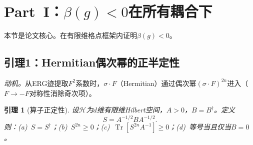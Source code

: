 \documentclass[12pt,a4paper]{article}
\theoremstyle{plain}
\newtheorem{lemma}[theorem]{引理}
\theoremstyle{definition}
\theoremstyle{remark}
\begin{document}
\section{Part~I：$\beta(g)<0$在所有耦合下}\label{sec:betaneg}

本节是论文核心。在有限维格点框架内证明$\beta(g)<0$。

\subsection{引理1：Hermitian偶次幂的正半定性}\label{sec:lemma1}

\textit{动机。}从ERG迹提取$F^2$系数时，$\sigma\cdot F$（Hermitian）通过偶次幂$(\sigma\cdot F)^{2n}$进入（$F\to -F$对称性消除奇次项）。

\begin{lemma}[算子正定性]\label{lem:op}
设$\mathcal{H}$为$d$维有限维Hilbert空间，$A>0$，$B=B^\dagger$。定义
\begin{equation}\label{eq:Sdef}
S = A^{-1/2}BA^{-1/2}.
\end{equation}
则：(a)~$S=S^\dagger$；(b)~$S^{2n}\geq 0$；(c)~$\operatorname{Tr}[S^{2n}A^{-1}]\geq 0$；(d)~等号当且仅当$B=0$。
\end{lemma}
\end{document}
